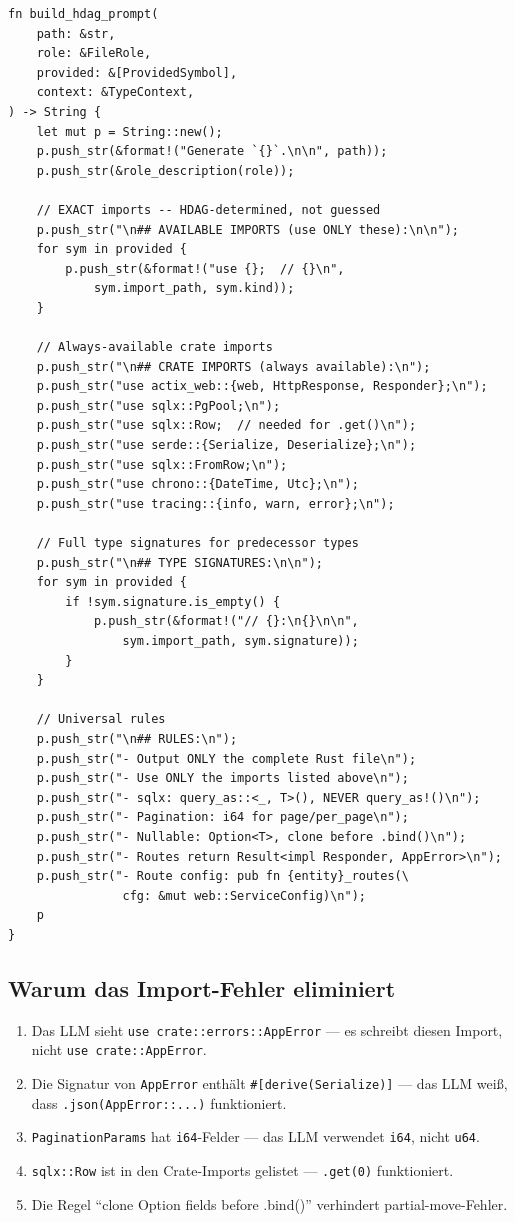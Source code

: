 \documentclass[11pt,a4paper]{article}
\begin{document}
\begin{lstlisting}
fn build_hdag_prompt(
    path: &str,
    role: &FileRole,
    provided: &[ProvidedSymbol],
    context: &TypeContext,
) -> String {
    let mut p = String::new();
    p.push_str(&format!("Generate `{}`.\n\n", path));
    p.push_str(&role_description(role));

    // EXACT imports -- HDAG-determined, not guessed
    p.push_str("\n## AVAILABLE IMPORTS (use ONLY these):\n\n");
    for sym in provided {
        p.push_str(&format!("use {};  // {}\n",
            sym.import_path, sym.kind));
    }

    // Always-available crate imports
    p.push_str("\n## CRATE IMPORTS (always available):\n");
    p.push_str("use actix_web::{web, HttpResponse, Responder};\n");
    p.push_str("use sqlx::PgPool;\n");
    p.push_str("use sqlx::Row;  // needed for .get()\n");
    p.push_str("use serde::{Serialize, Deserialize};\n");
    p.push_str("use sqlx::FromRow;\n");
    p.push_str("use chrono::{DateTime, Utc};\n");
    p.push_str("use tracing::{info, warn, error};\n");

    // Full type signatures for predecessor types
    p.push_str("\n## TYPE SIGNATURES:\n\n");
    for sym in provided {
        if !sym.signature.is_empty() {
            p.push_str(&format!("// {}:\n{}\n\n",
                sym.import_path, sym.signature));
        }
    }

    // Universal rules
    p.push_str("\n## RULES:\n");
    p.push_str("- Output ONLY the complete Rust file\n");
    p.push_str("- Use ONLY the imports listed above\n");
    p.push_str("- sqlx: query_as::<_, T>(), NEVER query_as!()\n");
    p.push_str("- Pagination: i64 for page/per_page\n");
    p.push_str("- Nullable: Option<T>, clone before .bind()\n");
    p.push_str("- Routes return Result<impl Responder, AppError>\n");
    p.push_str("- Route config: pub fn {entity}_routes(\
                cfg: &mut web::ServiceConfig)\n");
    p
}
\end{lstlisting}

\subsection{Warum das Import-Fehler eliminiert}

\begin{enumerate}[nosep]
\item Das LLM sieht \texttt{use crate::errors::AppError} --- es
  schreibt diesen Import, nicht \texttt{use crate::AppError}.
\item Die Signatur von \texttt{AppError} enthält
  \texttt{\#[derive(Serialize)]} --- das LLM weiß, dass
  \texttt{.json(AppError::...)} funktioniert.
\item \texttt{PaginationParams} hat \texttt{i64}-Felder ---
  das LLM verwendet \texttt{i64}, nicht \texttt{u64}.
\item \texttt{sqlx::Row} ist in den Crate-Imports gelistet ---
  \texttt{.get(0)} funktioniert.
\item Die Regel ``clone Option fields before .bind()'' verhindert
  partial-move-Fehler.
\end{enumerate}
\end{document}
